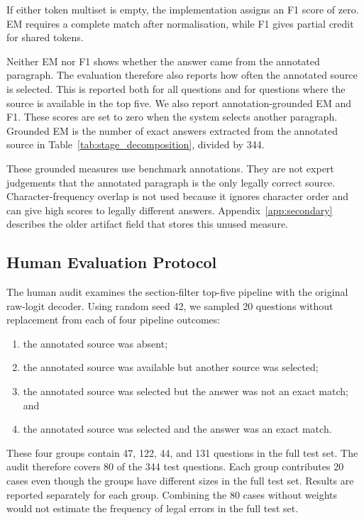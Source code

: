 \documentclass[pdflatex,sn-basic]{sn-jnl}%
\theoremstyle{thmstyleone}%
\theoremstyle{thmstyletwo}%
\theoremstyle{thmstylethree}%
\begin{document}
If either token multiset is empty, the implementation assigns an F1 score of
zero. EM requires a complete match after normalisation, while F1 gives partial
credit for shared tokens.

Neither EM nor F1 shows whether the answer came from the annotated paragraph.
The evaluation therefore also reports how often the annotated source is
selected. This is reported both for all questions and for questions where the
source is available in the top five. We also report annotation-grounded EM and
F1. These scores are set to zero when the system selects another paragraph.
Grounded EM is the number of exact answers extracted from the annotated source
in Table~\ref{tab:stage_decomposition}, divided by 344.

These grounded measures use benchmark annotations. They are not expert
judgements that the annotated paragraph is the only legally correct source.
Character-frequency overlap is not used because it ignores character order and
can give high scores to legally different answers. Appendix~\ref{app:secondary}
describes the older artifact field that stores this unused measure.

\subsection{Human Evaluation Protocol}
\label{sec:human_protocol}

The human audit examines the section-filter top-five pipeline with the original
raw-logit decoder. Using random seed 42, we sampled 20 questions without
replacement from each of four pipeline outcomes:

\begin{enumerate}[label=(\roman*)]
    \item the annotated source was absent;
    \item the annotated source was available but another source was selected;
    \item the annotated source was selected but the answer was not an exact
    match; and
    \item the annotated source was selected and the answer was an exact match.
\end{enumerate}

These four groups contain 47, 122, 44, and 131 questions in the full test set.
The audit therefore covers 80 of the 344 test questions. Each group contributes
20 cases even though the groups have different sizes in the full test set.
Results are reported separately for each group. Combining the 80 cases without
weights would not estimate the frequency of legal errors in the full test set.
\end{document}
